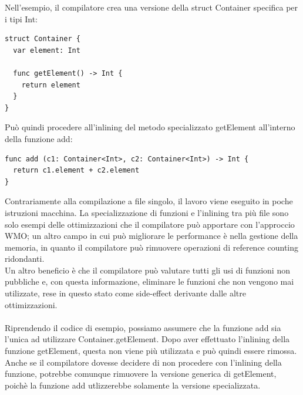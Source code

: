 Nell'esempio, il compilatore crea una versione della struct Container specifica per i tipi Int: 
\begin{lstlisting}
struct Container {
  var element: Int

  func getElement() -> Int {
    return element
  }
}
\end{lstlisting}
Può quindi procedere all'inlining del metodo specializzato getElement all'interno della funzione add:
\begin{lstlisting}
func add (c1: Container<Int>, c2: Container<Int>) -> Int {
  return c1.element + c2.element
}
\end{lstlisting}
Contrariamente alla compilazione a file singolo, il lavoro viene eseguito in poche istruzioni macchina. La specializzazione di funzioni e l'inlining tra più file sono solo esempi delle ottimizzazioni che il compilatore può apportare con l'approccio WMO; un altro campo in cui può migliorare le performance è nella gestione della memoria, in quanto il compilatore può rimuovere operazioni di reference counting ridondanti.\\
Un altro beneficio è che il compilatore può valutare tutti gli usi di funzioni non pubbliche e, con questa informazione, eliminare le funzioni che non vengono mai utilizzate, rese in questo stato come side-effect derivante dalle altre ottimizzazioni.\\\\Riprendendo il codice di esempio, possiamo assumere che la funzione add sia l'unica ad utilizzare Container.getElement. Dopo aver effettuato l'inlining della funzione getElement, questa non viene più utilizzata e può quindi essere rimossa. Anche se il compilatore dovesse decidere di non procedere con l'inlining della funzione, potrebbe comunque rimuovere la versione generica di getElement, poichè la funzione add utlizzerebbe solamente la versione specializzata.
